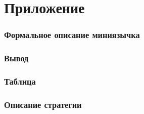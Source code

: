 \chapter*{Приложение}


\subsection*{Формальное описание миниязычка}


\subsection*{Вывод}


\subsection*{Таблица}


\subsection*{Описание стратегии}



